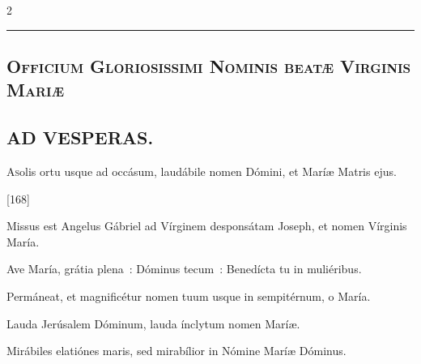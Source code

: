 \documentclass[9pt,twoside]{extarticle}
\begin{document}
\begin{multicols}{2}
{{\begin{center}\textcolor{red}{\rule{\linewidth}{0.5pt}} \end{center}

\subsection*{\center \textsc{Officium Gloriosissimi Nominis beatæ Virginis Mariæ}}
\subsubsection*{\center {}}
\begin{center}\end{center}


\subsection*{\center \textsc{AD VESPERAS.}}
\begin{center}\end{center}
\lettrine{A} solis ortu usque ad occásum, laudábile nomen Dómini, et Maríæ Matris ejus.

\begin{tightlist}{}
\item {} [168]
\item {} Missus est Angelus Gábriel ad Vírginem desponsátam Joseph, et nomen Vírginis María.
\item {} Ave María, grátia plena~: Dóminus tecum~: Benedícta tu in muliéribus.
\item {} Permáneat, et magnificétur nomen tuum usque in sempitérnum, o María.
\item {} Lauda Jerúsalem Dóminum, lauda ínclytum nomen Maríæ.
\item {} Mirábiles elatiónes maris, sed mirabílior in Nómine Maríæ Dóminus. 
\end{tightlist}

}}
\end{multicols}
\end{document}
